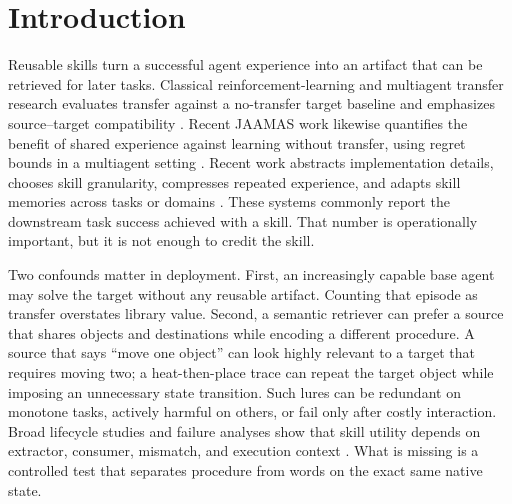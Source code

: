 \documentclass[pdflatex,sn-mathphys-num]{sn-jnl}
\begin{document}
\makeatletter
\def\@keywords{\par\addvspace{10pt}{\keywordfont{\bfseries\keywordname:}
LLM agents, agent skills, skill transfer, counterfactual evaluation,
procedural compatibility, negative transfer\par}}
\makeatother

\maketitle

\section{Introduction}
Reusable skills turn a successful agent experience into an artifact that can be
retrieved for later tasks. Classical reinforcement-learning and multiagent
transfer research evaluates transfer against a no-transfer target baseline and
emphasizes source--target compatibility \citep{taylor2009transfer,
dasilva2019survey}. Recent JAAMAS work likewise quantifies the benefit of
shared experience against learning without transfer, using regret bounds in a
multiagent setting \citep{tuynman2026quantification}. Recent work abstracts implementation details,
chooses skill granularity, compresses repeated experience, and adapts skill
memories across tasks or domains \citep{yu2026polyskill,feng2026breakdown,
xu2026compression,miao2026skilllens,he2026beyond}. These systems commonly report
the downstream task success achieved with a skill. That number is operationally
important, but it is not enough to credit the skill.

Two confounds matter in deployment. First, an increasingly capable base agent
may solve the target without any reusable artifact. Counting that episode as
transfer overstates library value. Second, a semantic retriever can prefer a
source that shares objects and destinations while encoding a different
procedure. A source that says ``move one object'' can look highly relevant to a
target that requires moving two; a heat-then-place trace can repeat the target
object while imposing an unnecessary state transition. Such lures can be
redundant on monotone tasks, actively harmful on others, or fail only after
costly interaction. Broad lifecycle studies and failure analyses show that skill
utility depends on extractor, consumer, mismatch, and execution context
\citep{huang2026consumption,dong2026harmful}. What is missing is a controlled
test that separates procedure from words on the exact same native state.
\end{document}
